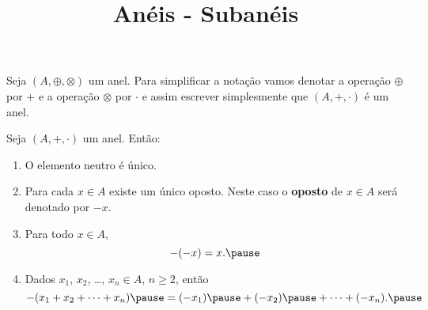 \documentclass{beamer}
\title{An\'eis - Suban\'eis}
\author[\autor]{\autor}
\institute[\instituto]{\instituto}
\date{}
\begin{document}
    \begin{frame}
        \maketitle
    \end{frame}


    \begin{frame}
        \begin{observacao}
            Seja $(A, \oplus, \otimes)$ \pause um anel. \pause Para simplificar a nota\c{c}\~ao \pause vamos denotar a opera\c{c}\~ao $\oplus$ \pause por $+$ \pause e a opera\c{c}\~ao $\otimes$ \pause por $\cdot$ \pause e assim escrever simplesmente \pause que $(A, +, \cdot)$ \pause \'e um anel.\pause
        \end{observacao}
    \end{frame}

    \begin{frame}
        \begin{proposicao}
            Seja $(A, + , \cdot)$ um anel. \pause Ent\~ao:\pause
            \begin{enumerate}[label={\roman*})]
                \item O elemento neutro {\'e} {\'u}nico.\pause

                \vspace{.5cm}

                \item Para cada $x \in A$ \pause existe um {\'u}nico oposto. \pause Neste caso o \textbf{oposto} de $x \in A$ \pause ser\'a denotado por $-x$.\pause

                \vspace{.5cm}

                \item Para todo $x \in A$, \pause
                \[
                    -(-x) = x.\pause
                \]

                \vspace{.5cm}

                \item Dados $x_{1}$, \pause $x_{2}$, \pause \dots, $x_n \in A$, \pause $n \geqslant 2$, \pause ent{\~a}o\pause
                \[
                    -(x_1 + x_2 + \dots + x_n) \pause = (-x_1) \pause + (-x_2) \pause + \dots + (-x_n).\pause
                \]

                \vspace{.2cm}

                \seti
            \end{enumerate}
        \end{proposicao}
    \end{frame}
\end{document}
